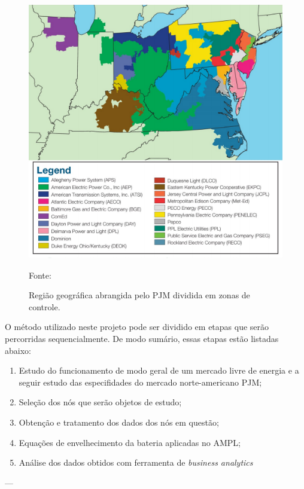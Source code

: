 \begin{figure}[htb]
	\caption{Região geográfica abrangida pelo PJM dividida em zonas de controle.}
	\begin{center}
	    \includegraphics[scale=0.6]{figuras/pjm_map.png}
	\end{center}
    \begin{center}
        \footnotesize {Fonte: }
    \end{center}
    \label{fig:pjm_map}
\end{figure}

O método utilizado neste projeto pode ser dividido em etapas que serão percorridas sequencialmente. De modo sumário, essas etapas estão listadas abaixo:
\begin{enumerate}
    \item Estudo do funcionamento de modo geral de um mercado livre de energia e a seguir estudo das especifidades do mercado norte-americano PJM;
    \item Seleção dos nós que serão objetos de estudo;
    \item Obtenção e tratamento dos dados dos nós em questão;
    \item Equações de envelhecimento da bateria aplicadas no AMPL;
    \item Análise dos dados obtidos com ferramenta de \textit{business analytics}
\end{enumerate}
---

